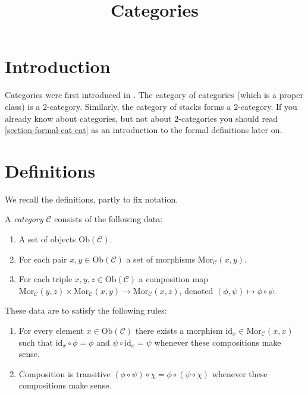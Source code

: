  


%


\title{Categories}


\maketitle

\tableofcontents
\section{Introduction}
\label{section-introduction}

\noindent
Categories were first introduced in \cite{GenEqui}.
The category of categories (which is a proper class)
is a $2$-category. Similarly, the category of stacks
forms a $2$-category. If you already know
about categories, but not about $2$-categories you
should read \ref{section-formal-cat-cat} as
an introduction to the formal definitions later on.

\section{Definitions}
\label{section-definition-categories}

\noindent
We recall the definitions, partly to fix notation.

\begin{definition}
\label{definition-category}
A {\it category} $\mathcal{C}$ consists of the following data:
\begin{enumerate}
\item A set of objects $\text{Ob}(\mathcal{C})$.
\item For each pair $x,y \in \text{Ob}(\mathcal{C})$ a set of morphisms
$\text{Mor}_\mathcal{C}(x,y)$.
\item For each triple $x,y,z\in \text{Ob}(\mathcal{C})$ a composition
map $ \text{Mor}_\mathcal{C}(y,z) \times \text{Mor}_\mathcal{C}(x,y) 
\to \text{Mor}_\mathcal{C}(x,z) $, denoted $(\phi, \psi) \mapsto 
\phi \circ \psi$.
\end{enumerate}
These data are to satisfy the following rules:
\begin{enumerate}
\item For every element $x\in \text{Ob}(\mathcal{C})$ there exists a
morphism $\text{id}_x\in \text{Mor}_\mathcal{C}(x,x)$ such that 
$\text{id}_x \circ \phi = \phi$ and $\psi \circ \text{id}_x = \psi $ whenever
these compositions make sense.
\item Composition is transitive $(\phi \circ \psi) \circ \chi =
\phi \circ ( \psi \circ \chi)$ whenever these compositions make sense.
\end{enumerate}
\end{definition}

